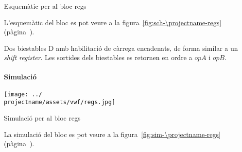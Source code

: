 \begin{contendfig}
  \begin{center}
  \end{center}
  \caption{\label{fig:sch-\projectname-regs} Esquemàtic per al bloc \textsf{regs}}
\end{contendfig}

L'esquemàtic del bloc es pot veure a la figura~\ref{fig:sch-\projectname-regs} (pàgina~\pageref{fig:sch-\projectname-regs}).

Dos biestables D amb habilitació de càrrega encadenats, de forma similar a un \emph{shift
register}. Les sortides dels biestables es retornen en ordre a $opA$ i $opB$.

\paragraph{Simulació}

\begin{contendfig}
  \begin{center}
    \texttt{[image: ../\\projectname/assets/vwf/regs.jpg]}
  \end{center}
  \caption{\label{fig:sim-\projectname-regs} Simulació per al bloc \textsf{regs}}
\end{contendfig}

La simulació del bloc es pot veure a la figura~\ref{fig:sim-\projectname-regs} (pàgina~\pageref{fig:sim-\projectname-regs}).


\vspace{1cm}
